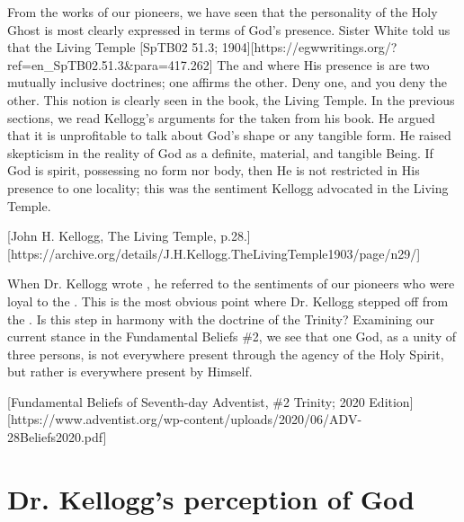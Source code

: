 From the works of our pioneers, we have seen that the personality of the Holy Ghost is most clearly expressed in terms of God's presence. Sister White told us that the Living Temple [SpTB02 51.3; 1904][https://egwwritings.org/?ref=en\_SpTB02.51.3&para=417.262] The  and where His presence is are two mutually inclusive doctrines; one affirms the other. Deny one, and you deny the other. This notion is clearly seen in the book, the Living Temple. In the previous sections, we read Kellogg's arguments for the  taken from his book. He argued that it is unprofitable to talk about God's shape or any tangible form. He raised skepticism in the reality of God as a definite, material, and tangible Being. If God is spirit, possessing no form nor body, then He is not restricted in His presence to one locality; this was the sentiment Kellogg advocated in the Living Temple.

[John H. Kellogg, The Living Temple, p.28.][https://archive.org/details/J.H.Kellogg.TheLivingTemple1903/page/n29/]

When Dr. Kellogg wrote , he referred to the sentiments of our pioneers who were loyal to the . This is the most obvious point where Dr. Kellogg stepped off from the . Is this step in harmony with the doctrine of the Trinity? Examining our current stance in the Fundamental Beliefs \#2, we see that one God, as a unity of three persons, is not everywhere present through the agency of the Holy Spirit, but rather is everywhere present by Himself.

[Fundamental Beliefs of Seventh-day Adventist, \#2 Trinity; 2020 Edition][https://www.adventist.org/wp-content/uploads/2020/06/ADV-28Beliefs2020.pdf]

\section*{Dr. Kellogg's perception of God}

